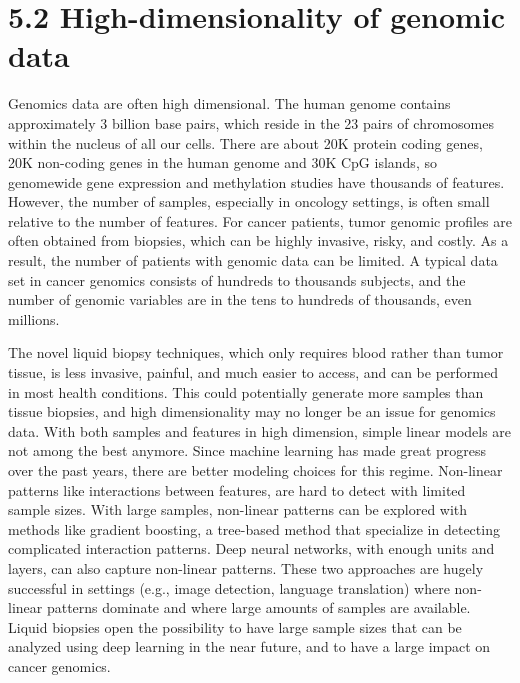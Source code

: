 \section*{5.2 \hspace{0.25cm} High-dimensionality of genomic data}
Genomics data are often high dimensional. The human genome contains approximately 3 billion base pairs, which reside in the 23 pairs of chromosomes within the nucleus of all our cells. There are about  20K protein coding genes, 20K non-coding genes in the human genome and 30K CpG islands, so genomewide gene expression and methylation studies have thousands of features. However, the number of samples, especially in oncology settings, is often small relative to the number of features. For cancer patients, tumor genomic profiles are often obtained from  biopsies, which can be highly invasive, risky, and costly. As a result, the number of patients with genomic data can be limited. A typical data set in cancer genomics consists of hundreds to thousands subjects, and the number of genomic variables are in the tens to hundreds of thousands, even millions. 

The novel liquid biopsy techniques, which only requires blood rather than tumor tissue, is less invasive, painful, and much easier to access, and can be performed in most health conditions. This could potentially generate more samples than tissue biopsies, and high dimensionality may no longer be an issue for genomics data. With both samples and features in high dimension, simple linear models are not among the best anymore. Since machine learning has made great progress over the past years, there are better modeling choices for this regime. Non-linear patterns like interactions between features, are hard to detect with limited sample sizes. With large samples, non-linear patterns can be explored with methods like gradient boosting, a tree-based method that specialize in detecting complicated interaction patterns. Deep neural networks, with enough units and layers, can also capture non-linear patterns. These two approaches are hugely successful in settings (e.g., image detection, language translation) where non-linear patterns dominate and where large amounts of samples are available. Liquid biopsies open the possibility to have large sample sizes that can be analyzed using deep learning in the near future, and to have a large impact on cancer genomics. 

